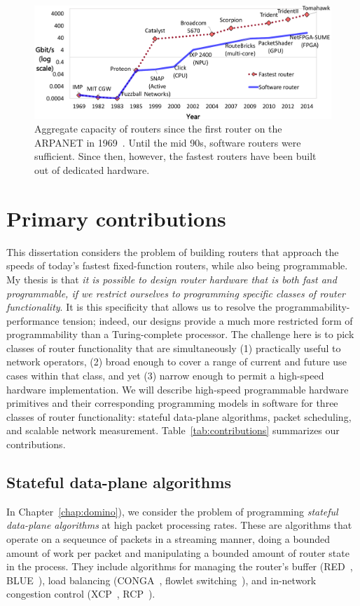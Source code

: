 \begin{figure}
\centering
\includegraphics[width=\columnwidth]{router_evolution.pdf}
\caption{Aggregate capacity of routers since the first router on the ARPANET in
1969~\cite{imp}. Until the mid 90s, software routers were sufficient. Since
then, however, the fastest routers have been built out of dedicated hardware.}
\label{fig:router_evolution}
\end{figure}

\section{Primary contributions}


This dissertation considers the problem of building routers that approach the
speeds of today's fastest fixed-function routers, while also being
programmable. My thesis is that {\em it is possible to design router hardware
that is both fast and programmable, if we restrict ourselves to programming
specific classes of router functionality}. It is this specificity that allows
us to resolve the programmability-performance tension; indeed, our designs
provide a much more restricted form of programmability than a Turing-complete
processor.  The challenge here is to pick classes of router functionality that
are simultaneously (1) practically useful to network operators, (2) broad
enough to cover a range of current and future use cases within that class, and
yet (3) narrow enough to permit a high-speed hardware implementation. We will
describe high-speed programmable hardware primitives and their corresponding
programming models in software for three classes of router functionality:
stateful data-plane algorithms, packet scheduling, and scalable network
measurement.  Table~\ref{tab:contributions} summarizes our contributions.

\subsection{Stateful data-plane algorithms}
In Chapter~\ref{chap:domino}), we consider the problem of programming {\em
stateful data-plane algorithms} at high packet processing rates. These are
algorithms that operate on a sequeunce of packets in a streaming manner, doing
a bounded amount of work per packet and manipulating a bounded amount of router
state in the process.  They include algorithms for managing the router's buffer
(\eg RED~\cite{red}, BLUE~\cite{blue}), load balancing (\eg CONGA~\cite{conga},
flowlet switching~\cite{flowlets}), and in-network congestion control (\eg XCP~\cite{xcp},
RCP~\cite{rcp}).

